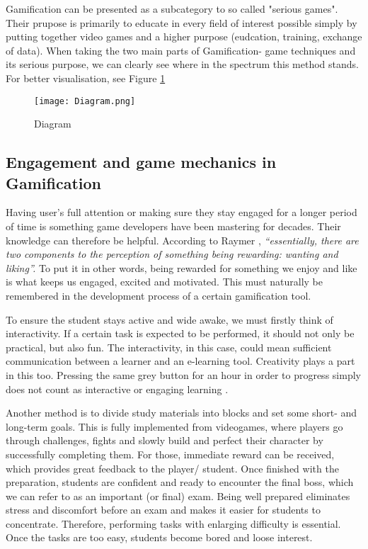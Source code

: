 \documentclass[10pt,english,a4paper]{article}
\begin{document}
	Gamification can be presented as a subcategory to so called "serious games". 
	Their prupose is primarily to educate in every field of interest possible simply by putting together video games and a higher purpose (eudcation, training, exchange of data). 
	When taking the two main parts of Gamification- game techniques and its serious purpose, we can clearly see where in the spectrum this method stands. \cite{Laucelli}
	For better visualisation, see Figure \ref{fig:diagram}

	\begin{figure}[hp]
		\centering
		\texttt{[image: Diagram.png]}
		\caption{Diagram}
		\label{fig:diagram}
	\end{figure}

\subsection{Engagement and game mechanics in Gamification} \label{section3.1}
	Having user’s full attention or making sure they stay engaged for a longer period of time is something game developers have been mastering for decades. 
	Their knowledge can therefore be helpful. 
	According to Raymer \cite{Raymer}, \textit{“essentially, there are two components to the perception of something being rewarding: wanting and liking”.} 
	To put it in other words, being rewarded for something we enjoy and like is what keeps us engaged, excited and motivated. 
	This must naturally be remembered in the development process of a certain gamification tool.

	To ensure the student stays active and wide awake, we must firstly think of interactivity. 
	If a certain task is expected to be performed, it should not only be practical, but also fun. 
	The interactivity, in this case, could mean sufficient communication between a learner and an e-learning tool. 
	Creativity plays a part in this too. Pressing the same grey button for an hour in order to progress simply does not count as interactive or engaging learning \cite{ AL-Smadi}. 
	
	Another method is to divide study materials into blocks and set some short- and long-term goals. 
	This is fully implemented from videogames, where players go through challenges, fights and slowly build and perfect their character by successfully completing them.
	For those, immediate reward can be received, which provides great feedback to the player/ student.
	Once finished with the preparation, students are confident and ready to encounter the final boss, which we can refer to as an important (or final) exam. 
	Being well prepared eliminates stress and discomfort before an exam and makes it easier for students to concentrate.
	Therefore, performing tasks with enlarging difficulty is essential. Once the tasks are too easy, students become bored and loose interest. 
\end{document}
